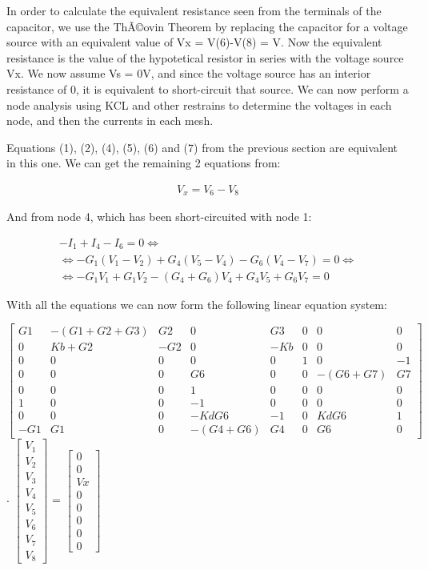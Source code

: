 In order to calculate the equivalent resistance seen from the terminals of the capacitor, we use the ThÃ©ovin Theorem by replacing the capacitor for a voltage source with an equivalent value of Vx = V(6)-V(8) =  V. Now the equivalent resistance is the value of the hypotetical resistor in series with the voltage source Vx. We now assume Vs = 0V, and since the voltage source has an interior resistance of 0, it is equivalent to short-circuit that source. We can now perform a node analysis using KCL and other restrains to determine the voltages in each node, and then the currents in each mesh.

Equations (1), (2), (4), (5), (6) and (7) from the previous section are equivalent in this one. We can get the remaining 2 equations from:

\begin{gather}
	V_x=V_6-V_8
\end{gather}

And from node 4, which has been short-circuited with node 1:

\begin{gather}
	-I_1+I_4-I_6=0 \iff \nonumber \\
	\iff -G_1(V_1-V_2)+G_4(V_5-V_4)-G_6(V_4-V_7)=0 \iff \\
	\iff -G_1V_1+G_1V_2-(G_4+G_6)V_4+G_4V_5+G_6V_7=0 \nonumber
\end{gather}

With all the equations we can now form the following linear equation system:

\fontsize{8}{12}\selectfont
$\begin{bmatrix}
    G1 & -(G1+G2+G3) & G2 & 0 & G3 & 0 & 0 & 0 \\
    0 & Kb+G2 & -G2 & 0 & -Kb & 0 & 0 & 0 \\
    0 & 0 & 0 & 0 & 0 & 1 & 0 & -1 \\
    0 & 0 & 0 & G6 & 0 & 0 & -(G6+G7) & G7 \\
    0 & 0 & 0 & 1 & 0 & 0 & 0 & 0 \\
    1 & 0 & 0 & -1 & 0 & 0 & 0 & 0 \\
    0 & 0 & 0 & -KdG6 & -1 & 0 & KdG6 & 1 \\
    -G1 & G1 & 0 & -(G4+G6) & G4 & 0 & G6 & 0
\end{bmatrix}$ $\cdot$
$\begin{bmatrix}
     V_1 \\V_2 \\V_3 \\V_4 \\V_5 \\V_6 \\V_7 \\V_8
\end{bmatrix}$ =
$\begin{bmatrix}
    0 \\0 \\Vx \\0 \\0 \\0 \\0 \\0 
\end{bmatrix}$

